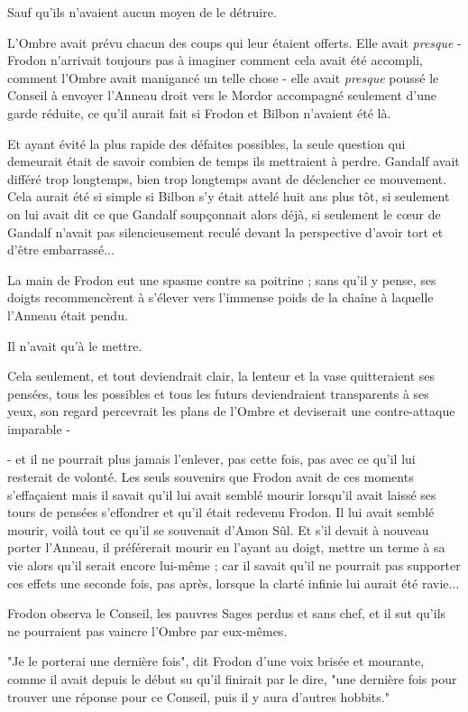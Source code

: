 Sauf qu'ils n'avaient aucun moyen de le détruire.

L'Ombre avait prévu chacun des coups qui leur étaient offerts. Elle avait \emph{presque}  - Frodon n'arrivait toujours pas à imaginer comment cela avait été accompli, comment l'Ombre avait manigancé un telle chose - elle avait \emph{presque}  poussé le Conseil à envoyer l'Anneau droit vers le Mordor accompagné seulement d'une garde réduite, ce qu'il aurait fait si Frodon et Bilbon n'avaient été là.

Et ayant évité la plus rapide des défaites possibles, la seule question qui demeurait était de savoir combien de temps ils mettraient à perdre. Gandalf avait différé trop longtemps, bien trop longtemps avant de déclencher ce mouvement. Cela aurait été si simple si Bilbon s'y était attelé huit ans plus tôt, si seulement on lui avait dit ce que Gandalf soupçonnait alors déjà, si seulement le cœur de Gandalf n'avait pas silencieusement reculé devant la perspective d'avoir tort et d'être embarrassé...

La main de Frodon eut une spasme contre sa poitrine ; sans qu'il y pense, ses doigts recommencèrent à s'élever vers l'immense poids de la chaîne à laquelle l'Anneau était pendu.

Il n'avait qu'à le mettre.

Cela seulement, et tout deviendrait clair, la lenteur et la vase quitteraient ses pensées, tous les possibles et tous les futurs deviendraient transparents à ses yeux, son regard percevrait les plans de l'Ombre et deviserait une contre-attaque imparable -

- et il ne pourrait plus jamais l'enlever, pas cette fois, pas avec ce qu'il lui resterait de volonté. Les seuls souvenirs que Frodon avait de ces moments s'effaçaient mais il savait qu'il lui avait semblé mourir lorsqu'il avait laissé ses tours de pensées s'effondrer et qu'il était redevenu Frodon. Il lui avait semblé mourir, voilà tout ce qu'il se souvenait d'Amon Sûl. Et s'il devait à nouveau porter l'Anneau, il préférerait mourir en l'ayant au doigt, mettre un terme à sa vie alors qu'il serait encore lui-même ; car il savait qu'il ne pourrait pas supporter ces effets une seconde fois, pas après, lorsque la clarté infinie lui aurait été ravie...

Frodon observa le Conseil, les pauvres Sages perdus et sans chef, et il sut qu'ils ne pourraient pas vaincre l'Ombre par eux-mêmes.

"Je le porterai une dernière fois", dit Frodon d'une voix brisée et mourante, comme il avait depuis le début su qu'il finirait par le dire, "une dernière fois pour trouver une réponse pour ce Conseil, puis il y aura d'autres hobbits."


